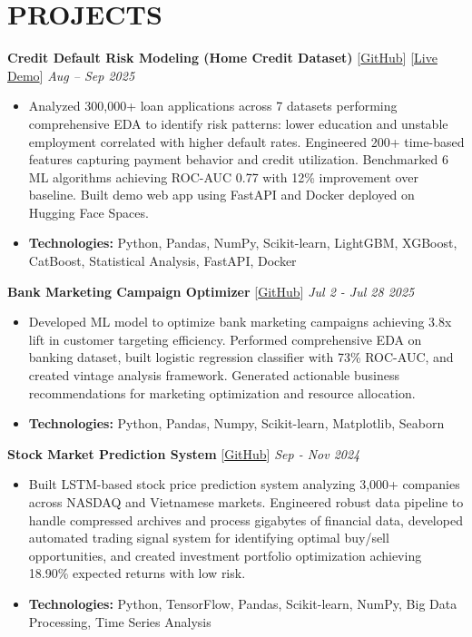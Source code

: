\documentclass[10pt, letterpaper]{article}
\newenvironment{highlights}{
    \begin{itemize}[
        topsep=1.5pt,
        parsep=0pt,
        partopsep=0pt,
        itemsep=1.5pt,
        leftmargin=10pt
    ]
}{
    \end{itemize}
}
\let\hrefWithoutArrow\href
\renewcommand{\href}[2]{\hrefWithoutArrow{#1}{#2}}
\begin{document}
\vspace{6pt}

\section{PROJECTS}

\noindent
\textbf{Credit Default Risk Modeling (Home Credit Dataset)} \small{[\href{https://github.com/HwanNorm/Home-Credit-Default-Risk-Prediction}{GitHub}] [\href{https://huggingface.co/spaces/CodexN/Home-Credit-Default-Risk}{Live Demo}]} \hfill \textit{Aug – Sep 2025}
\begin{highlights}
\item Analyzed 300,000+ loan applications across 7 datasets performing comprehensive EDA to identify risk patterns: lower education and unstable employment correlated with higher default rates. Engineered 200+ time-based features capturing payment behavior and credit utilization. Benchmarked 6 ML algorithms achieving ROC-AUC 0.77 with 12\% improvement over baseline. Built demo web app using FastAPI and Docker deployed on Hugging Face Spaces.
\item \textbf{Technologies:} Python, Pandas, NumPy, Scikit-learn, LightGBM, XGBoost, CatBoost, Statistical Analysis, FastAPI, Docker
\end{highlights}

\vspace{4pt}

\noindent
\textbf{Bank Marketing Campaign Optimizer} \small{[\href{https://github.com/HwanNorm/Bank-Marketing-Campaign-Optimizer}{GitHub}]} \hfill \textit{Jul 2 - Jul 28 2025}
\begin{highlights}
\item Developed ML model to optimize bank marketing campaigns achieving 3.8x lift in customer targeting efficiency. Performed comprehensive EDA on banking dataset, built logistic regression classifier with 73\% ROC-AUC, and created vintage analysis framework. Generated actionable business recommendations for marketing optimization and resource allocation.
\item \textbf{Technologies:} Python, Pandas, Numpy, Scikit-learn, Matplotlib, Seaborn
\end{highlights}

\vspace{4pt}

\noindent
\textbf{Stock Market Prediction System} \small{[\href{https://github.com/HwanNorm/Stock-Market-Prediction-System}{GitHub}]} \hfill \textit{Sep - Nov 2024}
\begin{highlights}
\item Built LSTM-based stock price prediction system analyzing 3,000+ companies across NASDAQ and Vietnamese markets. Engineered robust data pipeline to handle compressed archives and process gigabytes of financial data, developed automated trading signal system for identifying optimal buy/sell opportunities, and created investment portfolio optimization achieving 18.90\% expected returns with low risk.
\item \textbf{Technologies:} Python, TensorFlow, Pandas, Scikit-learn, NumPy, Big Data Processing, Time Series Analysis
\end{highlights}
\end{document}
